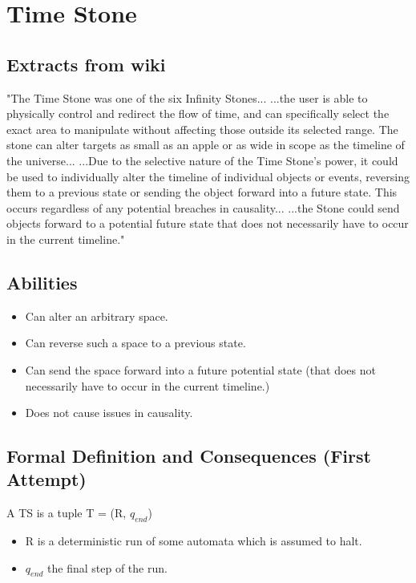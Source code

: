\documentclass{report}
\begin{document}
\chapter{Time Stone}

\section{Extracts from wiki}

"The Time Stone was one of the six Infinity Stones... ...the user is able to physically control and redirect the flow of time, and can specifically select the exact area to manipulate without affecting those outside its selected range. The stone can alter targets as small as an apple or as wide in scope as the timeline of the universe... ...Due to the selective nature of the Time Stone's power, it could be used to individually alter the timeline of individual objects or events, reversing them to a previous state or sending the object forward into a future state. This occurs regardless of any potential breaches in causality... ...the Stone could send objects forward to a potential future state that does not necessarily have to occur in the current timeline."

\section{Abilities}

\begin{itemize}
  \item Can alter an arbitrary space.
  \item Can reverse such a space to a previous state.
  \item Can send the space forward into a future potential state (that does not necessarily have to occur in the current timeline.)
  \item Does not cause issues in causality.
\end{itemize}

\newpage
\section{Formal Definition and Consequences (First Attempt)}

A TS is a tuple T = (R, $q_{end}$)

\begin{itemize}
  \item R is a deterministic run of some automata which is assumed to halt.
  \item $q_{end}$ the final step of the run.
\end{itemize}
\end{document}
